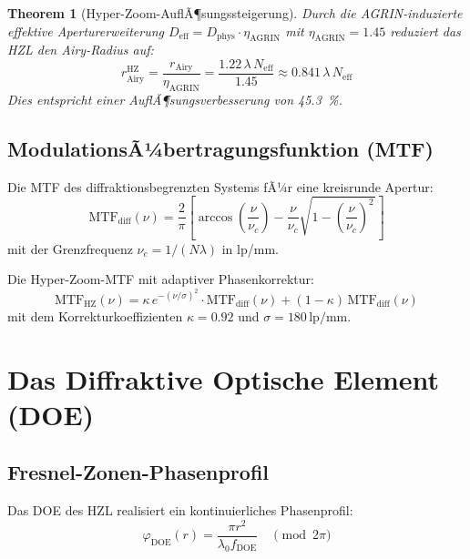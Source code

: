 ﻿\documentclass[12pt,a4paper]{article}
\newtheorem{theorem}{Theorem}[section]
\theoremstyle{definition}
\newcommand{\HZ}{\mathrm{HZ}}
\newcommand{\eff}{\mathrm{eff}}
\newcommand{\AGRIN}{\mathrm{AGRIN}}
\newcommand{\DOE}{\mathrm{DOE}}
\newcommand{\MTF}{\mathrm{MTF}}
\begin{document}
	\begin{theorem}[Hyper-Zoom-AuflÃ¶sungssteigerung]
		Durch die AGRIN-induzierte effektive Aperturerweiterung
		$D_\eff = D_\mathrm{phys}\cdot\eta_\AGRIN$ mit $\eta_\AGRIN = 1.45$
		reduziert das HZL den Airy-Radius auf:
		\begin{equation}
			r_\mathrm{Airy}^\HZ = \frac{r_\mathrm{Airy}}{\eta_\AGRIN}
			= \frac{1.22\,\lambda\,N_\eff}{1.45}
			\approx 0.841\,\lambda\,N_\eff
			\label{eq:hz_resolution}
		\end{equation}
		Dies entspricht einer AuflÃ¶sungsverbesserung von \SI{45.3}{\percent}.
	\end{theorem}
	
	\subsection{ModulationsÃ¼bertragungsfunktion (MTF)}
	
	Die MTF des diffraktionsbegrenzten Systems fÃ¼r eine kreisrunde Apertur:
	\begin{equation}
		\MTF_\mathrm{diff}(\nu) = \frac{2}{\pi}
		\left[\arccos\!\left(\frac{\nu}{\nu_c}\right)
		- \frac{\nu}{\nu_c}\sqrt{1-\left(\frac{\nu}{\nu_c}\right)^{\!2\,}}\right]
		\label{eq:mtf_diff}
	\end{equation}
	mit der Grenzfrequenz $\nu_c = 1/(N\lambda)$ in lp/mm.
	
	Die Hyper-Zoom-MTF mit adaptiver Phasenkorrektur:
	\begin{equation}
		\MTF_\HZ(\nu) = \kappa\,e^{-(\nu/\sigma)^2}\cdot\MTF_\mathrm{diff}(\nu)
		+ (1-\kappa)\,\MTF_\mathrm{diff}(\nu)
		\label{eq:mtf_hz}
	\end{equation}
	mit dem Korrekturkoeffizienten $\kappa = 0.92$ und
	$\sigma = 180\,\mathrm{lp/mm}$.
	
	\section{Das Diffraktive Optische Element (DOE)}
	
	\subsection{Fresnel-Zonen-Phasenprofil}
	
	Das DOE des HZL realisiert ein kontinuierliches Phasenprofil:
	\begin{equation}
		\varphi_\DOE(r) = \frac{\pi r^2}{\lambda_0 f_\DOE}
		\quad\pmod{2\pi}
		\label{eq:doe_phase}
	\end{equation}
	
\end{document}

